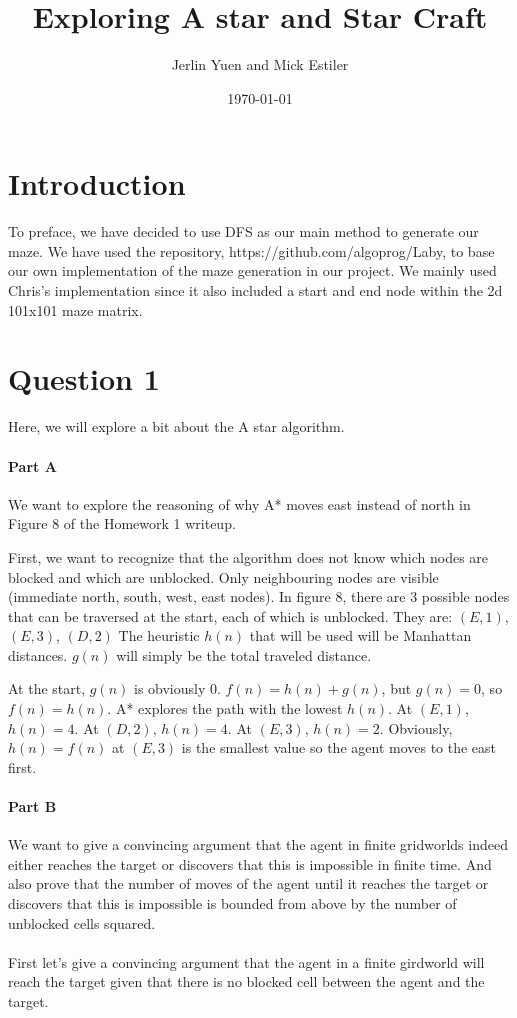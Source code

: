 \documentclass{article}
\title{Exploring A star and Star Craft}
\author{Jerlin Yuen and Mick Estiler}
\date{\today} %
\begin{document}
\maketitle

\section{Introduction}
To preface, we have decided to use DFS as our main method to generate our maze. We have used the repository, https://github.com/algoprog/Laby, to base our own implementation of the maze generation in our project. We mainly used Chris's implementation since it also included a start and end node within the 2d 101x101 maze matrix.

\section{Question 1}
Here, we will explore a bit about the A star algorithm.

\paragraph{Part A}

We want to explore the reasoning of why A* moves east instead of north in Figure 8 of the Homework 1 writeup.

First, we want to recognize that the algorithm does not know which nodes are blocked and which are unblocked. Only neighbouring nodes are visible (immediate north, south, west, east nodes). In figure 8, there are 3 possible nodes that can be traversed at the start, each of which is unblocked. They are: \((E, 1)\), \((E, 3)\), \((D, 2)\) The heuristic \(h(n)\) that will be used will be Manhattan distances. \(g(n)\) will simply be the total traveled distance. 

At the start, \(g(n)\) is obviously 0. \(f(n) = h(n) + g(n)\), but \(g(n) = 0\), so \(f(n) = h(n)\). A* explores the path with the lowest \(h(n)\). At \((E,1)\), \(h(n) = 4\). At \((D,2)\), \(h(n) = 4\). At \((E,3)\), \(h(n) = 2\). Obviously, \(h(n) = f(n)\) at \((E,3)\) is the smallest value so the agent moves to the east first.

\paragraph{Part B}
We want to give a convincing argument that the agent in finite gridworlds indeed either reaches the target or discovers that this is impossible in finite time. And also prove that the number of moves of the agent until it reaches the target or discovers that this is impossible is bounded from above by the number of unblocked cells squared. 
\\
\\
First let's give a convincing argument that the agent in a finite girdworld will reach the target given that there is no blocked cell between the agent and the target. 
\end{document}
